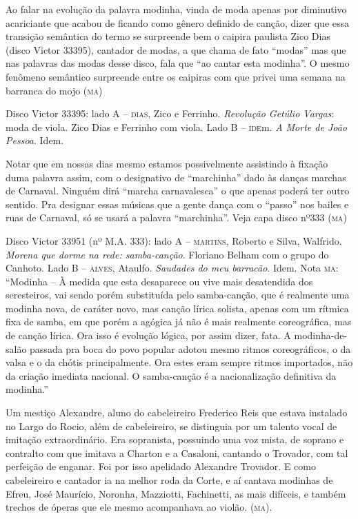 Ao falar na evolução da palavra modinha, vinda de moda apenas por
diminutivo acariciante que acabou de ficando como gênero definido de
canção, dizer que essa transição semântica do termo se surpreende bem o
caipira paulista Zico Dias (disco Victor 33395), cantador de modas, a
que chama de fato ``modas'' mas que nas palavras das modas desse disco,
fala que ``ao cantar esta modinha''. O mesmo fenômeno semântico surpreende
entre os caipiras com que privei uma semana na barranca do mojo (\textsc{ma})

Disco Victor 33395: lado A -- \textsc{dias}, Zico e Ferrinho. \emph{Revolução
Getúlio Vargas}: moda de viola. Zico Dias e Ferrinho com viola. Lado B --
\textsc{ide}m. \emph{A Morte de João Pessoa}. Idem.

Notar que em nossas dias mesmo estamos possivelmente assistindo à
fixação duma palavra assim, com o designativo de ``marchinha'' dado às
danças marchas de Carnaval. Ninguém dirá ``marcha carnavalesca'' o que
apenas poderá ter outro sentido. Pra designar essas músicas que a gente
dança com o ``passo'' nos bailes e ruas de Carnaval, só se usará a palavra
``marchinha''. Veja capa disco nº333 (\textsc{ma})

Disco Victor 33951 (nº M.A. 333): lado A -- \textsc{martins}, Roberto e Silva,
Walfrido. \emph{Morena que dorme na rede: samba-canção}. Floriano Belham
com o grupo do Canhoto. Lado B -- \textsc{alves}, Ataulfo. \emph{Saudades do meu
barracão}. Idem. Nota \textsc{ma}: ``Modinha -- À medida que esta desaparece ou
vive mais desatendida dos seresteiros, vai sendo porém substituída pelo
samba-canção, que é realmente uma modinha nova, de caráter novo, mas
canção lírica solista, apenas com um rítmica fixa de samba, em que porém
a agógica já não é mais realmente coreográfica, mas de canção lírica.
Ora isso é evolução lógica, por assim dizer, fata. A modinha-de-salão
passada pra boca do povo popular adotou mesmo ritmos coreográficos, o da
valsa e o da chótis principalmente. Ora estes eram sempre ritmos
importados, não da criação imediata nacional. O samba-canção é a
nacionalização definitiva da modinha.''

Um mestiço Alexandre, aluno do cabeleireiro Frederico Reis que estava
instalado no Largo do Rocio, além de cabeleireiro, se distinguia por um
talento vocal de imitação extraordinário. Era sopranista, possuindo uma
voz mista, de soprano e contralto com que imitava a Charton e a
Casaloni, cantando o Trovador, com tal perfeição de enganar. Foi por
isso apelidado Alexandre Trovador. E como cabeleireiro e cantador ia na
melhor roda da Corte, e aí cantava modinhas de Efreu, José Maurício,
Noronha, Mazziotti, Fachinetti, as mais difíceis, e também trechos de
óperas que ele mesmo acompanhava ao violão. (\textsc{ma}).

